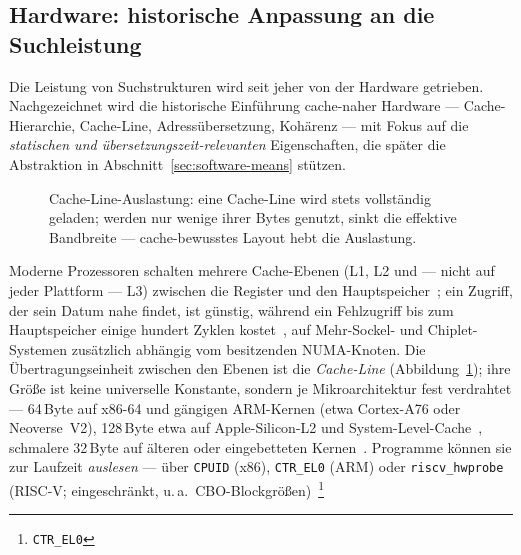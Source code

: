 \begin{nurlang}
\section{Hardware: historische Anpassung an die Suchleistung}\label{sec:hardware-history}
Die Leistung von Suchstrukturen wird seit jeher von der Hardware getrieben. Nachgezeichnet wird die
historische Einführung cache-naher Hardware --- Cache-Hierarchie, Cache-Line, Adressübersetzung, Kohärenz ---
mit Fokus auf die \emph{statischen und übersetzungszeit-relevanten} Eigenschaften, die später die
Abstraktion in Abschnitt~\ref{sec:software-means} stützen.
\begin{figure}[htbp]\centering
{}
\caption{Cache-Line-Auslastung: eine Cache-Line wird stets vollständig geladen; werden nur wenige ihrer Bytes genutzt, sinkt die effektive Bandbreite --- cache-bewusstes Layout hebt die Auslastung.}\label{fig:cache-line}
\end{figure}
Moderne Prozessoren schalten mehrere Cache-Ebenen (L1, L2 und --- nicht auf jeder Plattform --- L3)
zwischen die Register und den Hauptspeicher~\cite{hennessy2019architecture}; ein Zugriff, der sein Datum
nahe findet, ist günstig, während ein Fehlzugriff bis zum Hauptspeicher einige hundert Zyklen
kostet~\cite{drepper2007memory}, auf Mehr-Sockel- und Chiplet-Systemen zusätzlich abhängig vom besitzenden NUMA-Knoten.
Die Übertragungseinheit zwischen den Ebenen ist die \emph{Cache-Line} (Abbildung~\ref{fig:cache-line});
ihre Größe ist keine universelle Konstante, sondern je Mikroarchitektur fest verdrahtet --- 64\,Byte auf
x86-64 und gängigen ARM-Kernen (etwa Cortex-A76 oder Neoverse~V2), 128\,Byte etwa auf Apple-Silicon-L2
und System-Level-Cache~\cite{apple_optimization}, schmalere 32\,Byte auf älteren oder
eingebetteten Kernen~\cite{hennessy2019architecture,intel_optimization,amd_sog}.
Programme können sie zur Laufzeit \emph{auslesen} --- über \texttt{CPUID} (x86), \texttt{CTR\_EL0} (ARM)
oder \texttt{riscv\_hwprobe} (RISC-V\@; eingeschränkt, u.\,a.\ CBO-Blockgrößen)~\cite{arm_arm,intel_sdm,linux_riscv_hwprobe}\footnote{\texttt{CTR\_EL0}
}
\end{nurlang}
